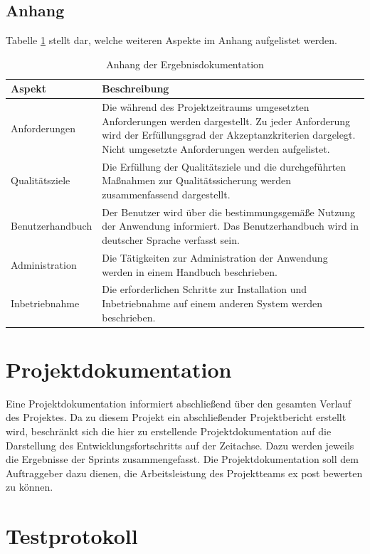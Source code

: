 \documentclass[a4paper,11pt,listof=numbered,glossary=totoc,parskip=half,toc=bib]{scrreprt}
\begin{document}
	\subsection{Anhang}
	Tabelle \ref{tab:ergebnisdokumentation_anhang} stellt dar, welche weiteren Aspekte im Anhang aufgelistet werden.
	\begin{table}
		\centering
		\begin{tabularx}{\textwidth}{lX}
			\toprule
			\textbf{Aspekt} & \textbf{Beschreibung} \\
			\midrule
			Anforderungen & Die während des Projektzeitraums umgesetzten Anforderungen werden dargestellt. Zu jeder Anforderung wird der Erfüllungsgrad der Akzeptanzkriterien dargelegt. Nicht umgesetzte Anforderungen werden aufgelistet. \\
			Qualitätsziele & Die Erfüllung der Qualitätsziele und die durchgeführten Maßnahmen zur Qualitätssicherung werden zusammenfassend dargestellt. \\
			Benutzerhandbuch & Der Benutzer wird über die bestimmungsgemäße Nutzung der Anwendung informiert. Das Benutzerhandbuch wird in deutscher Sprache verfasst sein. \\
			Administration & Die Tätigkeiten zur Administration der Anwendung werden in einem Handbuch beschrieben. \\
			Inbetriebnahme & Die erforderlichen Schritte zur Installation und Inbetriebnahme auf einem anderen System werden beschrieben. \\
			\bottomrule
		\end{tabularx}
		\caption{Anhang der Ergebnisdokumentation}
		\label{tab:ergebnisdokumentation_anhang}
	\end{table}
	
	\section{Projektdokumentation}
	Eine Projektdokumentation informiert abschließend über den gesamten Verlauf des Projektes. Da zu diesem Projekt ein abschließender Projektbericht erstellt wird, beschränkt sich die hier zu erstellende Projektdokumentation auf die Darstellung des Entwicklungsfortschritts auf der Zeitachse. Dazu werden jeweils die Ergebnisse der Sprints zusammengefasst. Die Projektdokumentation soll dem Auftraggeber dazu dienen, die Arbeitsleistung des Projektteams ex post bewerten zu können.
	 
	\section{Testprotokoll} %
	
\end{document}

